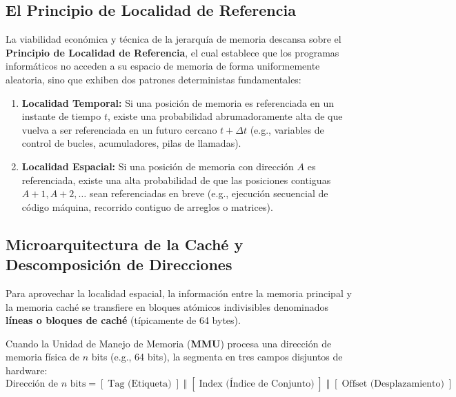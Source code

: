 \documentclass[11pt,letterpaper]{article}
\begin{document}
\subsection{El Principio de Localidad de Referencia}
La viabilidad económica y técnica de la jerarquía de memoria descansa sobre el \textbf{Principio de Localidad de Referencia}, el cual establece que los programas informáticos no acceden a su espacio de memoria de forma uniformemente aleatoria, sino que exhiben dos patrones deterministas fundamentales:
\begin{enumerate}
    \item \textbf{Localidad Temporal:} Si una posición de memoria es referenciada en un instante de tiempo $t$, existe una probabilidad abrumadoramente alta de que vuelva a ser referenciada en un futuro cercano $t + \Delta t$ (e.g., variables de control de bucles, acumuladores, pilas de llamadas).
    \item \textbf{Localidad Espacial:} Si una posición de memoria con dirección $A$ es referenciada, existe una alta probabilidad de que las posiciones contiguas $A + 1, A + 2, \dots$ sean referenciadas en breve (e.g., ejecución secuencial de código máquina, recorrido contiguo de arreglos o matrices).
\end{enumerate}

\subsection{Microarquitectura de la Caché y Descomposición de Direcciones}
Para aprovechar la localidad espacial, la información entre la memoria principal y la memoria caché se transfiere en bloques atómicos indivisibles denominados \textbf{líneas o bloques de caché} (típicamente de 64 bytes). 

Cuando la Unidad de Manejo de Memoria (\textbf{MMU}) procesa una dirección de memoria física de $n$ bits (e.g., 64 bits), la segmenta en tres campos disjuntos de hardware:
\begin{equation}
    \text{Dirección de } n \text{ bits} = [\;\text{Tag (Etiqueta)}\;] \;\Vert\; [\;\text{Index (Índice de Conjunto)}\;] \;\Vert\; [\;\text{Offset (Desplazamiento)}\;]
\end{equation}
\end{document}
